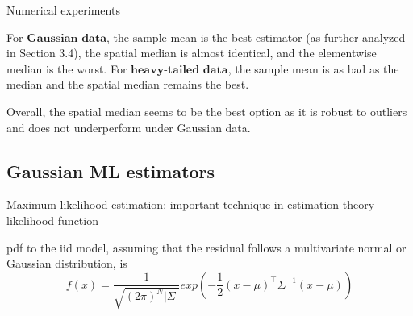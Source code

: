 Numerical experiments

For $\textbf{Gaussian data}$, the sample mean is the best estimator (as further analyzed in Section 3.4), the spatial median is almost identical, and the elementwise median is the worst. 
For $\textbf{heavy-tailed data}$, the sample mean is as bad as the median and the spatial median remains the best. 

Overall, the spatial median seems to be the best option as it is robust to outliers and does not underperform under Gaussian data.

\subsection{Gaussian ML estimators}
Maximum likelihood estimation: important technique in estimation theory
likelihood function

pdf to the iid model, assuming that the residual follows a multivariate normal or Gaussian distribution, is 
\[f(x) = \frac{1}{\sqrt{(2\pi)^N|\Sigma|}}exp(-\frac{1}{2}(x-\mu)^\intercal\Sigma^{-1}(x-\mu))\]